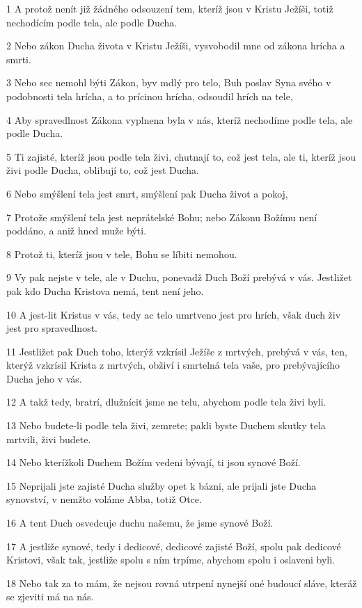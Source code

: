 \par 1 A protož nenít již žádného odsouzení tem, kteríž jsou v Kristu Ježíši, totiž nechodícím podle tela, ale podle Ducha.
\par 2 Nebo zákon Ducha života v Kristu Ježíši, vysvobodil mne od zákona hrícha a smrti.
\par 3 Nebo sec nemohl býti Zákon, byv mdlý pro telo, Buh poslav Syna svého v podobnosti tela hrícha, a to prícinou hrícha, odsoudil hrích na tele,
\par 4 Aby spravedlnost Zákona vyplnena byla v nás, kteríž nechodíme podle tela, ale podle Ducha.
\par 5 Ti zajisté, kteríž jsou podle tela živi, chutnají to, což jest tela, ale ti, kteríž jsou živi podle Ducha, oblibují to, což jest Ducha.
\par 6 Nebo smýšlení tela jest smrt, smýšlení pak Ducha život a pokoj,
\par 7 Protože smýšlení tela jest neprátelské Bohu; nebo Zákonu Božímu není poddáno, a aniž hned muže býti.
\par 8 Protož ti, kteríž jsou v tele, Bohu se líbiti nemohou.
\par 9 Vy pak nejste v tele, ale v Duchu, ponevadž Duch Boží prebývá v vás. Jestližet pak kdo Ducha Kristova nemá, tent není jeho.
\par 10 A jest-lit Kristus v vás, tedy ac telo umrtveno jest pro hrích, však duch živ jest pro spravedlnost.
\par 11 Jestližet pak Duch toho, kterýž vzkrísil Ježíše z mrtvých, prebývá v vás, ten, kterýž vzkrísil Krista z mrtvých, obživí i smrtelná tela vaše, pro prebývajícího Ducha jeho v vás.
\par 12 A takž tedy, bratrí, dlužnícit jsme ne telu, abychom podle tela živi byli.
\par 13 Nebo budete-li podle tela živi, zemrete; pakli byste Duchem skutky tela mrtvili, živi budete.
\par 14 Nebo kterížkoli Duchem Božím vedeni bývají, ti jsou synové Boží.
\par 15 Neprijali jste zajisté Ducha služby opet k bázni, ale prijali jste Ducha synovství, v nemžto voláme Abba, totiž Otce.
\par 16 A tent Duch osvedcuje duchu našemu, že jsme synové Boží.
\par 17 A jestliže synové, tedy i dedicové, dedicové zajisté Boží, spolu pak dedicové Kristovi, však tak, jestliže spolu s ním trpíme, abychom spolu i oslaveni byli.
\par 18 Nebo tak za to mám, že nejsou rovná utrpení nynejší oné budoucí sláve, kteráž se zjeviti má na nás.
